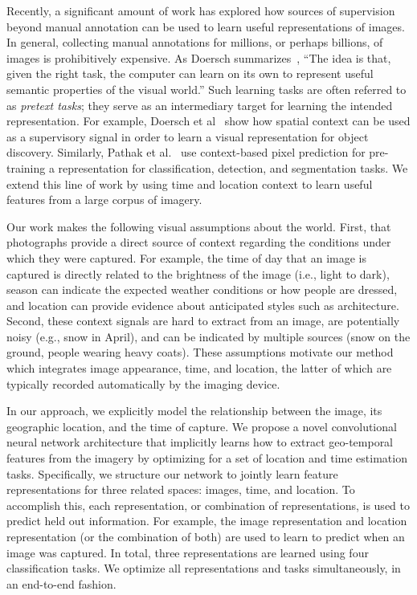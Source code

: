 \documentclass{bmvc2k}
\begin{document}
Recently, a significant amount of work has explored how sources of
supervision beyond manual annotation can be used to learn useful
representations of images. In general, collecting manual annotations
for millions, or perhaps billions, of images is prohibitively
expensive. As Doersch summarizes~\cite{doersch2016supervision}, ``The
idea is that, given the right task, the computer can learn on its own
to represent useful semantic properties of the visual world.'' Such
learning tasks are often referred to as {\em pretext tasks}; they
serve as an intermediary target for learning the intended
representation.  For example, Doersch et
al~\cite{doersch2015unsupervised} show how spatial context can be used
as a supervisory signal in order to learn a visual representation for
object discovery. Similarly, Pathak et al.~\cite{pathak2016context}
use context-based pixel prediction for pre-training a representation
for classification, detection, and segmentation tasks. We extend this
line of work by using time and location context to learn useful
features from a large corpus of imagery.

Our work makes the following visual assumptions about the world.
First, that photographs provide a direct source of context regarding
the conditions under which they were captured. For example, the time
of day that an image is captured is directly related to the brightness
of the image (i.e., light to dark), season can indicate the expected
weather conditions or how people are dressed, and location can provide
evidence about anticipated styles such as architecture. Second, these
context signals are hard to extract from an image, are potentially
noisy (e.g., snow in April), and can be indicated by multiple sources
(snow on the ground, people wearing heavy coats). These assumptions
motivate our method which integrates image appearance, time, and
location, the latter of which are typically recorded automatically by
the imaging device.

In our approach, we explicitly model the relationship between the
image, its geographic location, and the time of capture. We propose a
novel convolutional neural network architecture that implicitly learns
how to extract geo-temporal features from the imagery by optimizing for
a set of location and time estimation tasks. Specifically,
we structure our network to jointly learn feature representations for
three related spaces: images, time, and location. To accomplish this,
each representation, or combination of representations, is used to
predict held out information. For example, the image representation
and location representation (or the combination of both) are used to
learn to predict when an image was captured. In total, three representations 
are learned using four classification tasks.  We optimize all
representations and tasks simultaneously, in an end-to-end fashion.
\end{document}
